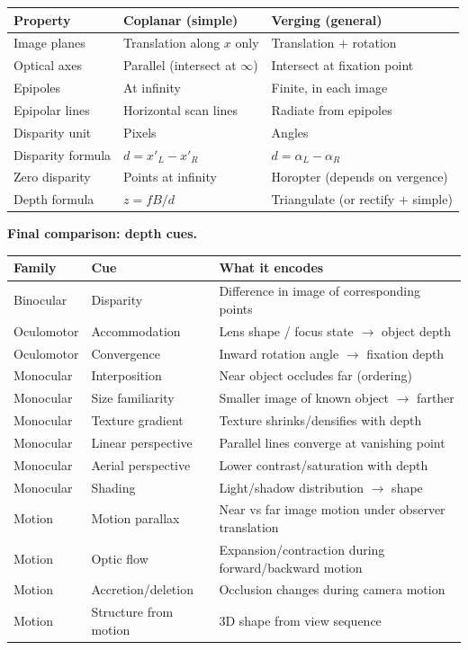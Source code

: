 \begin{center}
\renewcommand{\arraystretch}{1.3}
\begin{tabular}{@{} l l l @{}}
\toprule
\textbf{Property} & \textbf{Coplanar (simple)} & \textbf{Verging (general)} \\
\midrule
Image planes & Translation along $x$ only & Translation $+$ rotation \\
Optical axes & Parallel (intersect at $\infty$) & Intersect at fixation point \\
Epipoles & At infinity & Finite, in each image \\
Epipolar lines & Horizontal scan lines & Radiate from epipoles \\
Disparity unit & Pixels & Angles \\
Disparity formula & $d = x'_L - x'_R$ & $d = \alpha_L - \alpha_R$ \\
Zero disparity & Points at infinity & Horopter (depends on vergence) \\
Depth formula & $z = fB/d$ & Triangulate (or rectify $+$ simple) \\
\bottomrule
\end{tabular}
\end{center}

\textbf{Final comparison: depth cues.}

\begin{center}
\renewcommand{\arraystretch}{1.3}
\begin{tabular}{@{} l l p{6.5cm} @{}}
\toprule
\textbf{Family} & \textbf{Cue} & \textbf{What it encodes} \\
\midrule
Binocular & Disparity & Difference in image of corresponding points \\
Oculomotor & Accommodation & Lens shape / focus state $\to$ object depth \\
Oculomotor & Convergence & Inward rotation angle $\to$ fixation depth \\
Monocular & Interposition & Near object occludes far (ordering) \\
Monocular & Size familiarity & Smaller image of known object $\to$ farther \\
Monocular & Texture gradient & Texture shrinks/densifies with depth \\
Monocular & Linear perspective & Parallel lines converge at vanishing point \\
Monocular & Aerial perspective & Lower contrast/saturation with depth \\
Monocular & Shading & Light/shadow distribution $\to$ shape \\
Motion & Motion parallax & Near vs far image motion under observer translation \\
Motion & Optic flow & Expansion/contraction during forward/backward motion \\
Motion & Accretion/deletion & Occlusion changes during camera motion \\
Motion & Structure from motion & 3D shape from view sequence \\
\bottomrule
\end{tabular}
\end{center}
